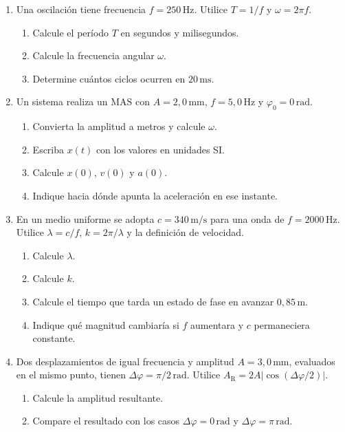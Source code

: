 \begin{enumerate}[label=\textbf{G\arabic*.},leftmargin=*]
    \item Una oscilación tiene frecuencia \(f=250\,\text{Hz}\). Utilice
    \(T=1/f\) y \(\omega=2\pi f\).
    \begin{enumerate}[label=\alph*)]
        \item Calcule el período \(T\) en segundos y milisegundos.
        \item Calcule la frecuencia angular \(\omega\).
        \item Determine cuántos ciclos ocurren en \(20\,\text{ms}\).
    \end{enumerate}

    \item Un sistema realiza un MAS con
    \(A=2{,}0\,\text{mm}\), \(f=5{,}0\,\text{Hz}\) y
    \(\varphi_0=0\,\text{rad}\).
    \begin{enumerate}[label=\alph*)]
        \item Convierta la amplitud a metros y calcule \(\omega\).
        \item Escriba \(x(t)\) con los valores en unidades SI.
        \item Calcule \(x(0)\), \(v(0)\) y \(a(0)\).
        \item Indique hacia dónde apunta la aceleración en ese instante.
    \end{enumerate}

    \item En un medio uniforme se adopta
    \(c=340\,\text{m}/\text{s}\) para una onda de
    \(f=2000\,\text{Hz}\). Utilice
    \(\lambda=c/f\), \(k=2\pi/\lambda\) y la definición de velocidad.
    \begin{enumerate}[label=\alph*)]
        \item Calcule \(\lambda\).
        \item Calcule \(k\).
        \item Calcule el tiempo que tarda un estado de fase en avanzar
        \(0{,}85\,\text{m}\).
        \item Indique qué magnitud cambiaría si \(f\) aumentara y \(c\)
        permaneciera constante.
    \end{enumerate}

    \item Dos desplazamientos de igual frecuencia y amplitud
    \(A=3{,}0\,\text{mm}\), evaluados en el mismo punto, tienen
    \(\Delta\varphi=\pi/2\,\text{rad}\). Utilice
    \(A_\mathrm{R}=2A|\cos(\Delta\varphi/2)|\).
    \begin{enumerate}[label=\alph*)]
        \item Calcule la amplitud resultante.
        \item Compare el resultado con los casos
        \(\Delta\varphi=0\,\text{rad}\) y
        \(\Delta\varphi=\pi\,\text{rad}\).
    \end{enumerate}
\end{enumerate}

